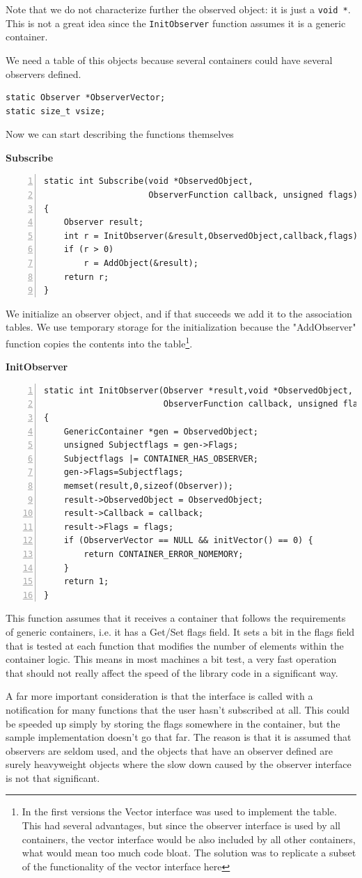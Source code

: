\documentclass[12pt,a4paper]{memoir} %
\newif\iftth
\newcommand{\container}{}
\newcommand{\function}[1] {%
\vspace{0.2in}
\par\noindent
\textbf{#1}\index{#1!code for \container} \hrulefill
\iftth\else
\nopagebreak
\fi
\noindent\begin{Verbatim}[numbers=left, xleftmargin=7mm]}
\begin{document}
{{Note that we do not characterize further the observed object: it is just a \verb,void *,. This is not
a great idea since the \verb,InitObserver, function assumes it is a generic container.

We need a table of this objects because several containers could have several observers defined.
\begin{verbatim}
static Observer *ObserverVector;
static size_t vsize;
\end{verbatim}
Now we can start describing the functions themselves
\function{Subscribe}
static int Subscribe(void *ObservedObject, 
                     ObserverFunction callback, unsigned flags)
{
    Observer result;
    int r = InitObserver(&result,ObservedObject,callback,flags);
    if (r > 0)
        r = AddObject(&result);
    return r;
}
\end{Verbatim}
We initialize an observer object, and if that succeeds we add it to the association tables.
We use temporary storage for the initialization because the "AddObserver" function copies
the contents into the table\footnote{In the first versions the Vector interface was used
to implement the table. This had several advantages, but since the observer interface is used by all
containers, the vector interface would be also included by all other containers, what would
mean too much code bloat. The solution was to replicate a subset of the functionality of the vector
interface here}.
\function{InitObserver}
static int InitObserver(Observer *result,void *ObservedObject, 
                        ObserverFunction callback, unsigned flags)
{
    GenericContainer *gen = ObservedObject;
    unsigned Subjectflags = gen->Flags;
    Subjectflags |= CONTAINER_HAS_OBSERVER;
    gen->Flags=Subjectflags;
    memset(result,0,sizeof(Observer));
    result->ObservedObject = ObservedObject;
    result->Callback = callback;
    result->Flags = flags;
    if (ObserverVector == NULL && initVector() == 0) {
        return CONTAINER_ERROR_NOMEMORY;
    }
    return 1;
}
\end{Verbatim}
This function assumes that it receives a container that follows the requirements of generic containers,
i.e. it has a Get/Set flags field. It sets a bit in the flags field that is tested at each function
that modifies the number of elements within the container logic. This means in most machines a bit
test, a very fast operation that should not really affect the speed of the library code in a
significant way.

A far more important consideration is that the interface is called with a notification for many
functions that the user hasn't subscribed at all. This could be speeded up simply by storing
the flags somewhere in the container, but the sample implementation doesn't go that far. The
reason is that it is assumed that observers are seldom used, and the objects that have an
observer defined are surely heavyweight objects where the slow down caused by the observer
interface is not that significant.

}}
\end{document}
